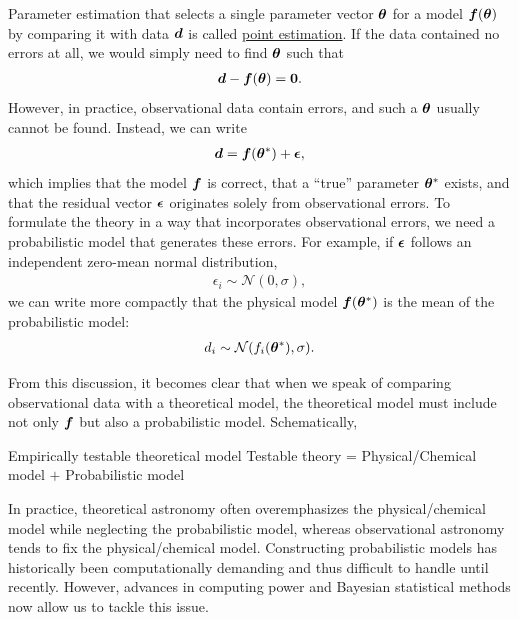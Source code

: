 Parameter estimation that selects a single parameter vector $\boldsymbol{\theta}$ for a model $\boldsymbol{f}(\boldsymbol{\theta})$ by comparing it with data $\boldsymbol{d}$ is called \underline{point estimation}. If the data contained no errors at all, we would simply need to find $\boldsymbol{\theta}$ such that
\begin{align}
\boldsymbol{d} - \boldsymbol{f}(\boldsymbol{\theta}) = \boldsymbol{0} .
\end{align}
However, in practice, observational data contain errors, and such a $\boldsymbol{\theta}$ usually cannot be found. Instead, we can write
\begin{align}
\boldsymbol{d} = \boldsymbol{f}(\boldsymbol{\theta}^\ast) + \boldsymbol{\epsilon} ,
\end{align}
which implies that the model $\boldsymbol{f}$ is correct, that a “true” parameter $\boldsymbol{\theta}^\ast$ exists, and that the residual vector $\boldsymbol{\epsilon}$ originates solely from observational errors. To formulate the theory in a way that incorporates observational errors, we need a probabilistic model that generates these errors. For example, if $\boldsymbol{\epsilon}$ follows an independent zero-mean normal distribution,
\begin{align}
\epsilon_i \sim \mathcal{N}(0,\sigma) ,
\end{align}
we can write more compactly that the physical model $\boldsymbol{f}(\boldsymbol{\theta}^\ast)$ is the mean of the probabilistic model:
\begin{align}
d_i \sim \mathcal{N} (f_i(\boldsymbol{\theta}^\ast), \sigma) .
\end{align}

From this discussion, it becomes clear that when we speak of comparing observational data with a theoretical model, the theoretical model must include not only $\boldsymbol{f}$ but also a probabilistic model. Schematically,
\begin{itembox}{Empirically testable theoretical model}
Testable theory = Physical/Chemical model $+$ Probabilistic model
\end{itembox}

In practice, theoretical astronomy often overemphasizes the physical/chemical model while neglecting the probabilistic model, whereas observational astronomy tends to fix the physical/chemical model. Constructing probabilistic models has historically been computationally demanding and thus difficult to handle until recently. However, advances in computing power and Bayesian statistical methods now allow us to tackle this issue.

